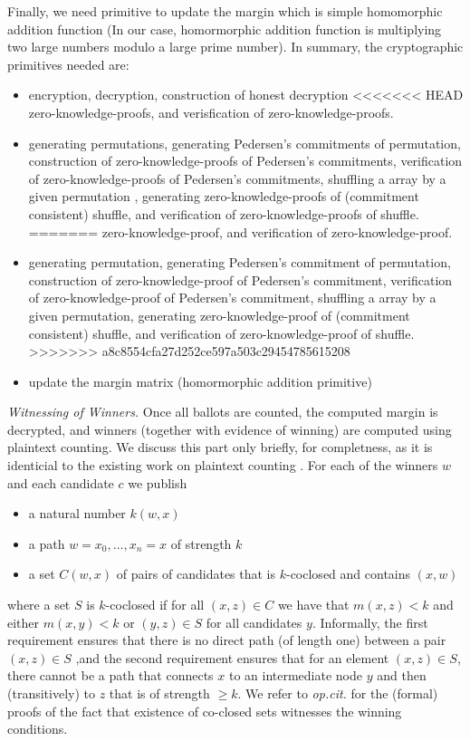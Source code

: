\documentclass{llncs}
\begin{document}
Finally, we need primitive to update the margin which is simple homomorphic
addition function (In our case, homormorphic 
 addition function is multiplying two large numbers modulo a large prime 
 number).
In summary, the cryptographic primitives needed are: 
\begin{itemize} 
\item encryption, decryption, construction of honest decryption
<<<<<<< HEAD
     zero-knowledge-proofs, and verisfication of zero-knowledge-proofs. 
\item generating permutations, generating Pedersen's 
     commitments \cite{Pederson} of permutation, construction of 
     zero-knowledge-proofs of Pedersen's commitments, verification of 
     zero-knowledge-proofs of Pedersen's commitments, shuffling a array 
     by a given permutation \cite{Wikstrom:2009:CPS}, 
     generating zero-knowledge-proofs of (commitment consistent) shuffle, 
     and verification of zero-knowledge-proofs of shuffle.
=======
     zero-knowledge-proof, and verification of zero-knowledge-proof. 
\item generating permutation, generating  Pedersen's 
     commitment of permutation, construction of 
     zero-knowledge-proof of Pedersen's commitment, verification of 
     zero-knowledge-proof of Pedersen's commitment, shuffling a array 
     by a given permutation, 
     generating zero-knowledge-proof of (commitment consistent) shuffle, 
     and verification of zero-knowledge-proof of shuffle.
>>>>>>> a8c8554cfa27d252ce597a503c29454785615208
\item  update the margin matrix (homormorphic addition primitive)
\end{itemize}



\smallskip\noindent\emph{Witnessing of Winners.}
Once all ballots are counted, the computed margin is decrypted, and
winners (together with evidence of winning) are computed using 
plaintext counting. We discuss this part only briefly, for completness,
 as it is identicial to the existing work on plaintext counting
\cite{Pattinson:2017:SVE}. For each of the winners $w$ and each
candidate $c$ we publish
\begin{itemize}
\item a natural number $k(w, x)$
\item a path $w = x_0, \dots, x_n = x$ of strength $k$
\item a set $C(w, x)$ of pairs of candidates that is $k$-coclosed
and contains $(x, w)$
\end{itemize}
where a set $S$ is  $k$-coclosed if for all $(x,z) \in C$ we have
that $m(x, z) < k$ and either $m(x, y) < k$ or $(y,z) \in S$ for
all candidates $y$.  Informally, the first requirement ensures that
there is no direct path (of length one) between a pair $(x, z) \in
S$ ,and the second requirement ensures that for an element $(x, z)
\in S$, there cannot be a path that connects $x$ to an intermediate
node $y$ and then (transitively) to $z$ that is of strength $\geq
k$. 
We refer to \emph{op.cit.} for the (formal)
proofs of the fact that existence of co-closed sets witnesses the
winning conditions. 
  
\end{document}
